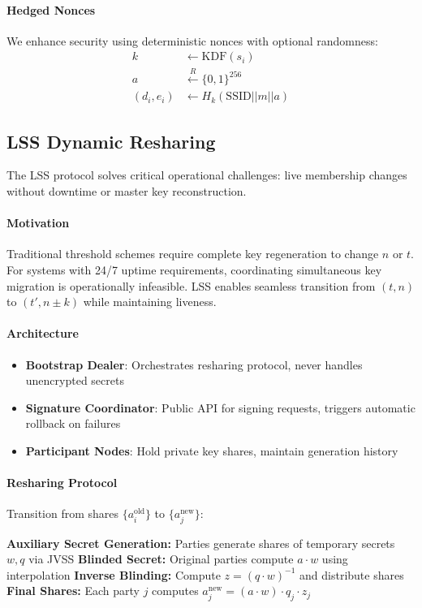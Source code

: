 \paragraph{Hedged Nonces} We enhance security using deterministic nonces with optional randomness:
\begin{align*}
k &\leftarrow \text{KDF}(s_i) \\
a &\xleftarrow{R} \{0,1\}^{256} \\
(d_i, e_i) &\leftarrow H_k(\text{SSID} || m || a)
\end{align*}

\subsection{LSS Dynamic Resharing}

The LSS protocol \cite{seesahai2025} solves critical operational challenges: live membership changes without downtime or master key reconstruction.

\paragraph{Motivation} Traditional threshold schemes require complete key regeneration to change $n$ or $t$. For systems with 24/7 uptime requirements, coordinating simultaneous key migration is operationally infeasible. LSS enables seamless transition from $(t,n)$ to $(t', n \pm k)$ while maintaining liveness.

\paragraph{Architecture}
\begin{itemize}
\item \textbf{Bootstrap Dealer}: Orchestrates resharing protocol, never handles unencrypted secrets
\item \textbf{Signature Coordinator}: Public API for signing requests, triggers automatic rollback on failures
\item \textbf{Participant Nodes}: Hold private key shares, maintain generation history
\end{itemize}

\paragraph{Resharing Protocol} Transition from shares $\{a_i^{\text{old}}\}$ to $\{a_j^{\text{new}}\}$:
\begin{algorithmic}[1]
\State \textbf{Auxiliary Secret Generation:} Parties generate shares of temporary secrets $w, q$ via JVSS
\State \textbf{Blinded Secret:} Original parties compute $a \cdot w$ using interpolation
\State \textbf{Inverse Blinding:} Compute $z = (q \cdot w)^{-1}$ and distribute shares
\State \textbf{Final Shares:} Each party $j$ computes $a_j^{\text{new}} = (a \cdot w) \cdot q_j \cdot z_j$
\end{algorithmic}

